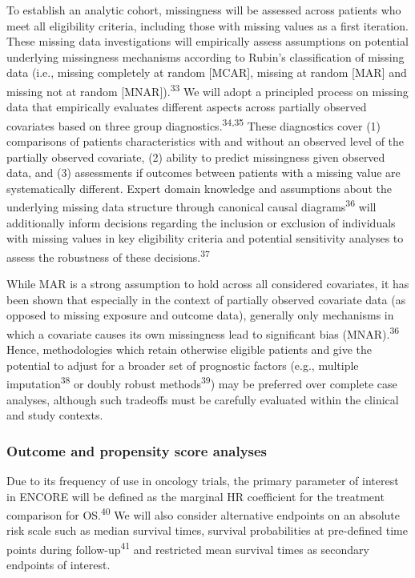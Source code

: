 \documentclass[
  letterpaper,
  DIV=11,
  numbers=noendperiod]{scrartcl}
\begin{document}
To establish an analytic cohort, missingness will be assessed across
patients who meet all eligibility criteria, including those with missing
values as a first iteration. These missing data investigations will
empirically assess assumptions on potential underlying missingness
mechanisms according to Rubin's classification of missing data (i.e.,
missing completely at random {[}MCAR{]}, missing at random {[}MAR{]} and
missing not at random {[}MNAR{]}).\textsuperscript{33} We will adopt a
principled process on missing data that empirically evaluates different
aspects across partially observed covariates based on three group
diagnostics.\textsuperscript{34,35} These diagnostics cover (1)
comparisons of patients characteristics with and without an observed
level of the partially observed covariate, (2) ability to predict
missingness given observed data, and (3) assessments if outcomes between
patients with a missing value are systematically different. Expert
domain knowledge and assumptions about the underlying missing data
structure through canonical causal diagrams\textsuperscript{36} will
additionally inform decisions regarding the inclusion or exclusion of
individuals with missing values in key eligibility criteria and
potential sensitivity analyses to assess the robustness of these
decisions.\textsuperscript{37}

While MAR is a strong assumption to hold across all considered
covariates, it has been shown that especially in the context of
partially observed covariate data (as opposed to missing exposure and
outcome data), generally only mechanisms in which a covariate causes its
own missingness lead to significant bias (MNAR).\textsuperscript{36}
Hence, methodologies which retain otherwise eligible patients and give
the potential to adjust for a broader set of prognostic factors (e.g.,
multiple imputation\textsuperscript{38} or doubly robust
methods\textsuperscript{39}) may be preferred over complete case
analyses, although such tradeoffs must be carefully evaluated within the
clinical and study contexts.

\subsubsection{Outcome and propensity score
analyses}\label{outcome-and-propensity-score-analyses}

Due to its frequency of use in oncology trials, the primary parameter of
interest in ENCORE will be defined as the marginal HR coefficient for
the treatment comparison for OS.\textsuperscript{40} We will also
consider alternative endpoints on an absolute risk scale such as median
survival times, survival probabilities at pre-defined time points during
follow-up\textsuperscript{41} and restricted mean survival times as
secondary endpoints of interest.
\end{document}
